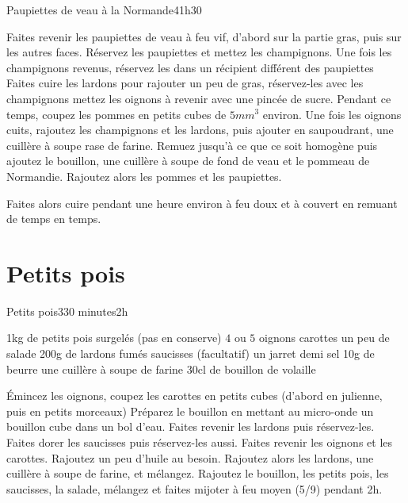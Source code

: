{\begin{recette}{Paupiettes de veau à la Normande}{4}{1h30}{}
\begin{preparation}
\etape Faites revenir les paupiettes de veau à feu vif, d'abord sur la partie gras, puis sur les autres faces. 
\etape Réservez les paupiettes et mettez les champignons.
\etape Une fois les champignons revenus, réservez les dans un récipient différent des paupiettes
\etape Faites cuire les lardons pour rajouter un peu de gras, réservez-les avec les champignons
\etape mettez les oignons à revenir avec une pincée de sucre. 
\etape Pendant ce temps, coupez les pommes en petits cubes de $5\unit{mm^3}$ environ. 
\etape Une fois les oignons cuits, rajoutez les champignons et les lardons, puis ajouter en saupoudrant, une cuillère à soupe 
rase de farine. Remuez jusqu'à ce que ce soit homogène puis ajoutez le bouillon, une cuillère à soupe de fond de veau et le 
pommeau de Normandie. 
\etape Rajoutez alors les pommes et les paupiettes.
\end{preparation}

\begin{cuisson}
Faites alors cuire pendant une heure environ à feu doux et à couvert en remuant de temps en temps.
\end{cuisson}


\end{recette}

\section{Petits pois}
\begin{recette}{Petits pois}{3}{30 minutes}{2h}
\begin{ingredients}
\ingredient 1kg de petits pois surgelés (pas en conserve)
\ingredient $4$ ou $5$ oignons
 carottes
\ingredient un peu de salade
\ingredient 200g de lardons fumés
 saucisses
\ingredient (facultatif) un jarret demi sel
\ingredient 10g de beurre
\ingredient une cuillère à soupe de farine
\ingredient 30cl de bouillon de volaille
\end{ingredients}

\begin{preparation}
\etape Émincez les oignons, coupez les carottes en petits cubes (d'abord en julienne, puis en petits morceaux)
\etape Préparez le bouillon en mettant au micro-onde un bouillon cube dans un bol d'eau.
\etape Faites revenir les lardons puis réservez-les. Faites dorer les saucisses puis réservez-les aussi.
\etape Faites revenir les oignons et les carottes. Rajoutez un peu d'huile au besoin.
\etape Rajoutez alors les lardons, une cuillère à soupe de farine, et mélangez.
\etape Rajoutez le bouillon, les petits pois, les saucisses, la salade, mélangez et faites mijoter à feu moyen (5/9) pendant 2h.
\end{preparation}


\end{recette}}
